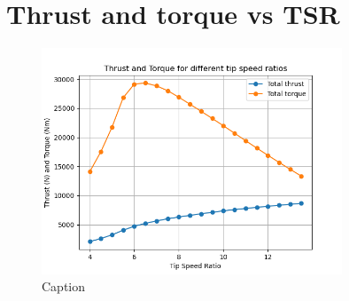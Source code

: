 \section{Thrust and torque vs TSR}
\begin{figure}[H]
    \centering
    \includegraphics[width=0.8\textwidth]{Figures/Thrust_torque_TSR.png}
    \caption{Caption}
    \label{fig:enter-label}
\end{figure}

